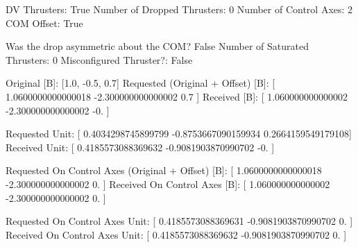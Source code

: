 DV Thrusters:	True
Number of Dropped Thrusters:	0
Number of Control Axes:	2
COM Offset:	True

Was the drop asymmetric about the COM?	False
Number of Saturated Thrusters:	0
Misconfigured Thruster?:	False

Original [B]:	[1.0, -0.5, 0.7]
Requested (Original + Offset) [B]:	[ 1.0600000000000018 -2.300000000000002   0.7               ]
Received [B]:		[ 1.060000000000002 -2.300000000000002 -0.               ]

Requested Unit:		[ 0.4034298745899799 -0.8753667090159934  0.2664159549179108]
Received Unit:		[ 0.4185573088369632 -0.9081903870990702 -0.                ]

Requested On Control Axes (Original + Offset) [B]:	[ 1.0600000000000018 -2.300000000000002   0.                ]
Received On Control Axes [B]:		[ 1.060000000000002 -2.300000000000002  0.               ]

Requested On Control Axes Unit:		[ 0.4185573088369631 -0.9081903870990702  0.                ]
Received On Control Axes Unit:		[ 0.4185573088369632 -0.9081903870990702  0.                ]

